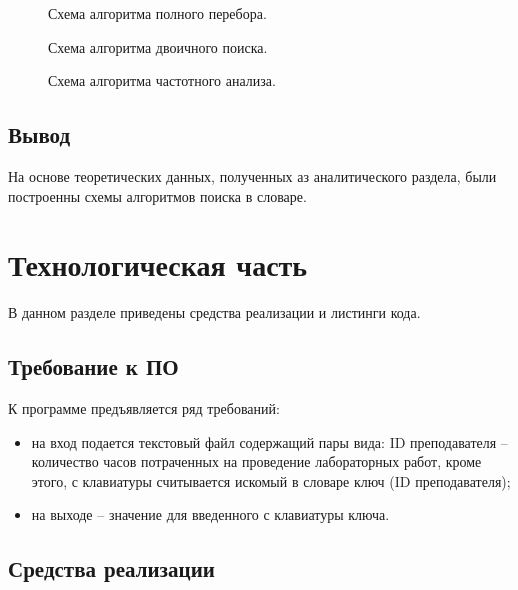 \documentclass[12pt]{report}
\begin{document}
	
	\begin{figure}[h]
		\centering
		\caption{Схема алгоритма полного перебора.}
		\label{fig:mpr}
	\end{figure}
	
	\begin{figure}[h]
		\centering
		\caption{Схема алгоритма двоичного поиска.}
		\label{fig:mpr}
	\end{figure}
	
	\begin{figure}[h]
		\centering
		\caption{Схема алгоритма частотного анализа.}
		\label{fig:mpr}
	\end{figure}
	
	
	\section*{Вывод}
	
	На основе теоретических данных, полученных аз аналитического раздела, были построенны схемы алгоритмов поиска в словаре.
	
	\chapter{Технологическая часть}
	
	В данном разделе приведены средства реализации и листинги кода.
	
	\section{Требование к ПО}
	
	К программе предъявляется ряд требований:
	
	\begin{itemize}
		\item на вход подается текстовый файл содержащий пары вида: ID преподавателя -- количество часов потраченных на проведение лабораторных работ, кроме этого, с клавиатуры считывается искомый в словаре ключ (ID преподавателя);
		\item на выходе -- значение для введенного с клавиатуры ключа.
	\end{itemize}
	
	\section{Средства реализации}
	
\end{document}

